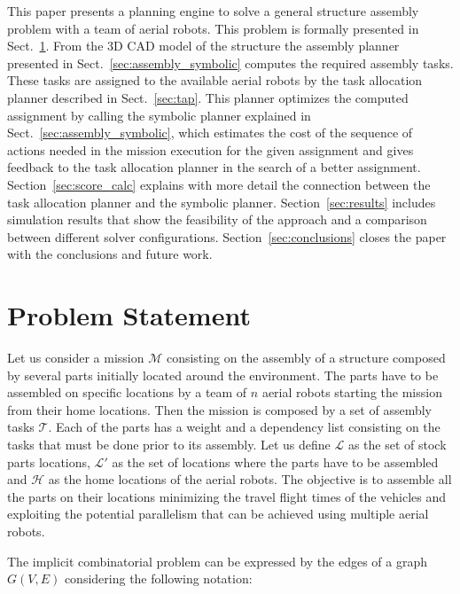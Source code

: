 \documentclass[runningheads,a4paper]{llncs}
\begin{document}
This paper presents a planning engine to solve a general structure assembly problem with a team of aerial robots. This problem is formally presented in Sect.~\ref{sec:pdef}. From the 3D CAD model of the structure the assembly planner presented in Sect.~\ref{sec:assembly_symbolic} computes the required assembly tasks. These tasks are assigned to the available aerial robots by the task allocation planner described in Sect.~\ref{sec:tap}. This planner optimizes the computed assignment by calling the symbolic planner explained in Sect.~\ref{sec:assembly_symbolic}, which estimates the cost of the sequence of actions needed in the mission execution for the given assignment and gives feedback to the task allocation planner in the search of a better assignment. Section~\ref{sec:score_calc} explains with more detail the connection between the task allocation planner and the symbolic planner. Section~\ref{sec:results} includes simulation results that show the feasibility of the approach and a comparison between different solver configurations. Section~\ref{sec:conclusions} closes the paper with the conclusions and future work.

\section{Problem Statement}
    \label{sec:pdef}
    
Let us consider a mission $\mathcal{M}$ consisting on the assembly of a structure composed by several parts initially located around the environment. The parts have to be assembled on specific locations by a team of $n$ aerial robots starting the mission from their home locations. Then the mission is composed by a set of assembly tasks $\mathcal{T}$. Each of the parts has a weight and a dependency list consisting on the tasks that must be done prior to its assembly. Let us define $\mathcal{L}$ as the set of stock parts locations, $\mathcal{L'}$ as the set of locations where the parts have to be assembled and $\mathcal{H}$ as the home locations of the aerial robots. The objective is to assemble all the parts on their locations minimizing the travel flight times of the vehicles and exploiting the potential parallelism that can be achieved using multiple aerial robots.
    
The implicit combinatorial problem can be expressed by the edges of a graph $G(V,E)$ considering the following notation:
    
\end{document}
